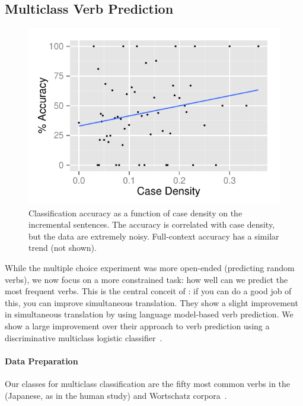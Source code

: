\subsection{Multiclass Verb Prediction}

\begin{figure}[t!]
  \begin{center} \includegraphics[width=1.0\linewidth]{2016_conll_verbpred/figures/CF_density_incremental} \caption{
      Classification accuracy as a function of case density on the
      incremental sentences.  The accuracy is correlated with case density,
      but the data are extremely noisy.  Full-context accuracy has a
      similar trend (not shown).}
\label{fig:CF_case_density}
\end{center}
\end{figure}

While the multiple choice experiment was more open-ended (predicting
random verbs), we now focus on a more constrained task: how well can
we predict the most frequent verbs.  This is the central conceit of
: if you can do a good job of this, you can
improve simultaneous translation.  They show a slight improvement in
simultaneous translation by using \ngram{} language model-based verb
prediction.  We show a large improvement over their approach to verb
prediction using a discriminative multiclass logistic
classifier~\cite{langford2007vowpal}.

\paragraph{Data Preparation}

Our classes for multiclass classification are the fifty most common
verbs in the  (Japanese, as in the human study) and
Wortschatz corpora~\cite[German]{biemann2007leipzig}.

